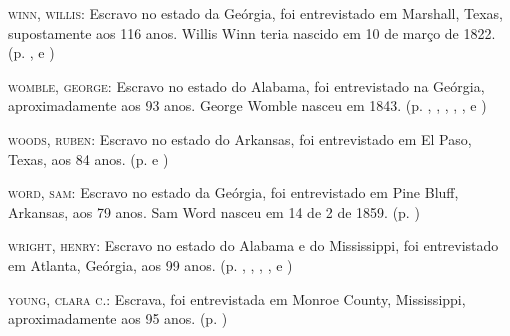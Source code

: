 \begin{Parskip}
\textsc{winn, willis:} Escravo no estado da Geórgia, foi entrevistado em
Marshall, Texas, supostamente aos 116 anos. Willis Winn teria nascido em
10 de março de 1822. (p. \pageref{ref303}, \pageref{ref304} e \pageref{ref305})

\textsc{womble, george:} Escravo no estado do Alabama, foi entrevistado
na Geórgia, aproximadamente aos 93 anos. George Womble nasceu em 1843. (p. \pageref{ref306}, \pageref{ref307}, \pageref{ref308}, \pageref{ref309}, \pageref{ref310}, \pageref{ref311} e \pageref{ref312})

\textsc{woods, ruben:} Escravo no estado do Arkansas, foi entrevistado
em El Paso, Texas, aos 84 anos. (p. \pageref{ref313} e \pageref{ref314})

\textsc{word, sam:} Escravo no estado da Geórgia, foi entrevistado em
Pine Bluff, Arkansas, aos 79 anos. Sam Word nasceu em 14 de 2 de 1859. (p. \pageref{ref315})

\textsc{wright, henry:} Escravo no estado do Alabama e do Mississippi,
foi entrevistado em Atlanta, Geórgia, aos 99 anos. (p. \pageref{ref316}, \pageref{ref317}, \pageref{ref318}, \pageref{ref319}, \pageref{ref320} e \pageref{ref321})

\textsc{young, clara c.:} Escrava, foi entrevistada em Monroe County,
Mississippi, aproximadamente aos 95 anos. (p. \pageref{ref322})
\end{Parskip}